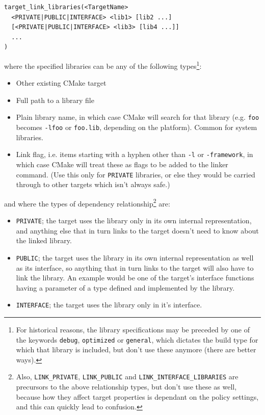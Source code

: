 \documentclass[table, xcdraw]{article}%
\begin{document}
\begin{verbatim}
target_link_libraries(<TargetName>
  <PRIVATE|PUBLIC|INTERFACE> <lib1> [lib2 ...]
  [<PRIVATE|PUBLIC|INTERFACE> <lib3> [lib4 ...]]
  ...
)
\end{verbatim}

where the specified libraries can be any of the following types\footnote{For historical reasons, the library specifications may be preceded by one of the keywords \texttt{debug}, \texttt{optimized} or \texttt{general}, which dictates the build type for which that library is included, but don't use these anymore (there are better ways).}:

\begin{itemize}
    \item Other existing CMake target
    \item Full path to a library file
    \item Plain library name, in which case CMake will search for that library (e.g. \texttt{foo} becomes \texttt{-lfoo} or \texttt{foo.lib}, depending on the platform). Common for system libraries.
    \item Link flag, i.e. items starting with a hyphen other than \texttt{-l} or \texttt{-framework}, in which case CMake will treat these as flags to be added to the linker command. (Use this only for \texttt{PRIVATE} libraries, or else they would be carried through to other targets which isn't always safe.)
\end{itemize}

and where the types of dependency relationship\footnote{Also, \texttt{LINK_PRIVATE}, \texttt{LINK_PUBLIC} and \texttt{LINK_INTERFACE_LIBRARIES} are precursors to the above relationship types, but don't use these as well, because how they affect target properties is dependant on the policy settings, and this can quickly lead to confusion.} are:

\begin{itemize}
    \item \texttt{PRIVATE}; the target uses the library only in its own internal representation, and anything else that in turn links to the target doesn't need to know about the linked library.
    \item \texttt{PUBLIC}; the target uses the library in its own internal representation as well as its interface, so anything that in turn links to the target will also have to link the library. An example would be one of the target's interface functions having a parameter of a type defined and implemented by the library.
    \item \texttt{INTERFACE}; the target uses the library only in it's interface.
\end{itemize}
\end{document}
